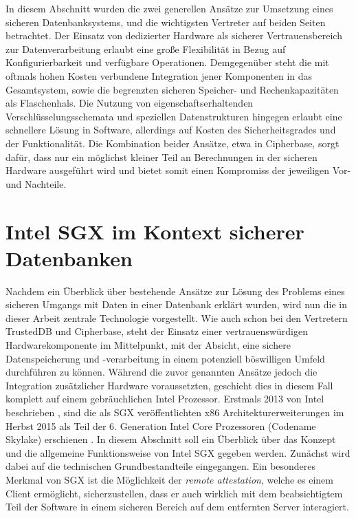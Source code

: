 In diesem Abschnitt wurden die zwei generellen Ansätze zur Umsetzung eines sicheren Datenbanksystems, und die wichtigsten Vertreter auf beiden Seiten betrachtet. Der Einsatz von dedizierter Hardware als sicherer Vertrauensbereich zur Datenverarbeitung erlaubt eine große Flexibilität in Bezug auf Konfigurierbarkeit und verfügbare Operationen. Demgegenüber steht die mit oftmals hohen Kosten verbundene Integration jener Komponenten in das Gesamtsystem, sowie die begrenzten sicheren Speicher- und Rechenkapazitäten als Flaschenhals. Die Nutzung von eigenschaftserhaltenden Verschlüsselungsschemata und speziellen Datenstrukturen hingegen erlaubt eine schnellere Lösung in Software, allerdings auf Kosten des Sicherheitsgrades und der Funktionalität. Die Kombination beider Ansätze, etwa in Cipherbase, sorgt dafür, dass nur ein möglichst kleiner Teil an Berechnungen in der sicheren Hardware ausgeführt wird und bietet somit einen Kompromiss der jeweiligen Vor- und Nachteile.

\section{Intel SGX im Kontext sicherer Datenbanken}

Nachdem ein Überblick über bestehende Ansätze zur Lösung des Problems eines sicheren Umgangs mit Daten in einer Datenbank erklärt wurden, wird nun die in dieser Arbeit zentrale Technologie vorgestellt. Wie auch schon bei den Vertretern TrustedDB und Cipherbase, steht der Einsatz einer vertrauenswürdigen Hardwarekomponente im Mittelpunkt, mit der Absicht, eine sichere Datenspeicherung und -verarbeitung in einem potenziell böswilligen Umfeld durchführen zu können. Während die zuvor genannten Ansätze jedoch die Integration zusätzlicher Hardware voraussetzten, geschieht dies in diesem Fall komplett auf einem gebräuchlichen Intel Prozessor.
Erstmals 2013 von Intel beschrieben \cite{McKeen2013}, sind die als \ac{SGX} veröffentlichten x86 Architekturerweiterungen im Herbst 2015 als Teil der 6. Generation Intel Core Prozessoren (Codename Skylake) erschienen \cite{Aumasson2016}. In diesem Abschnitt soll ein Überblick über das Konzept und die allgemeine Funktionsweise von Intel \ac{SGX} gegeben werden. Zunächst wird dabei auf die technischen Grundbestandteile eingegangen. Ein besonderes Merkmal von \ac{SGX} ist die Möglichkeit der \textit{remote attestation}, welche es einem Client ermöglicht, sicherzustellen, dass er auch wirklich mit dem beabsichtigtem Teil der Software in einem sicheren Bereich auf dem entfernten Server interagiert.

